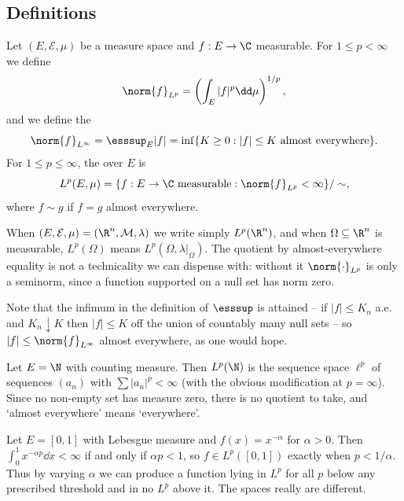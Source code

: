 \subsection{Definitions}

\begin{definition}[$L^p$ norm]
	Let $(E, \mathcal{E}, \mu)$ be a measure space and $f : E \to \C$ measurable. For $1 \le p < \infty$ we define
	$$\norm{f}_{L^p} = \left( \int_E |f|^p \dd \mu \right)^{1/p},$$
	and we define the 
	$$\norm{f}_{L^\infty} = \esssup_E |f| = \inf\{ K \ge 0 : |f| \le K \text{ almost everywhere}\}.$$
	For $1 \le p \le \infty$, the  over $E$ is
	$$L^p(E, \mu) = \{ f : E \to \C \text{ measurable} : \norm{f}_{L^p} < \infty \} / \sim,$$
	where $f \sim g$ if $f = g$ almost everywhere.
\end{definition}

When $(E, \mathcal{E}, \mu) = (\R^n, \mathcal{M}, \lambda)$ we write simply $L^p(\R^n)$, and when $\Omega \subseteq \R^n$ is measurable, $L^p(\Omega)$ means $L^p(\Omega, \lambda|_\Omega)$. The quotient by almost-everywhere equality is not a technicality we can dispense with: without it $\norm{\cdot}_{L^p}$ is only a seminorm, since a function supported on a null set has norm zero.

Note that the infimum in the definition of $\esssup$ is attained -- if $|f| \le K_n$ a.e. and $K_n \downarrow K$ then $|f| \le K$ off the union of countably many null sets -- so $|f| \le \norm{f}_{L^\infty}$ almost everywhere, as one would hope.

\begin{example}
	Let $E = \N$ with counting measure. Then $L^p(\N)$ is the sequence space $\ell^p$ of sequences $(a_n)$ with $\sum |a_n|^p < \infty$ (with the obvious modification at $p = \infty$). Since no non-empty set has measure zero, there is no quotient to take, and `almost everywhere' means `everywhere'.
\end{example}

\begin{example}
	Let $E = [0,1]$ with Lebesgue measure and $f(x) = x^{-\alpha}$ for $\alpha > 0$. Then $\int_0^1 x^{-\alpha p} \dd x < \infty$ if and only if $\alpha p < 1$, so $f \in L^p([0,1])$ exactly when $p < 1/\alpha$. Thus by varying $\alpha$ we can produce a function lying in $L^p$ for all $p$ below any prescribed threshold and in no $L^p$ above it. The spaces really are different.
\end{example}

